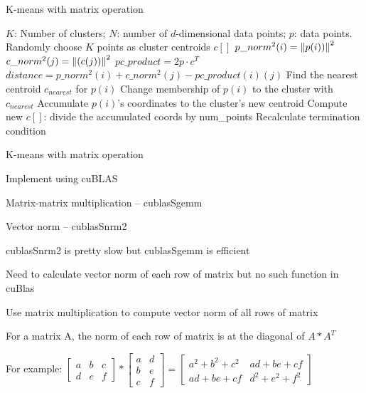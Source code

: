 \documentclass[
nopagebreaks,
style=klope,
fleqn]{powerdot}
\begin{document}
\begin{slide}{K-means with matrix operation}
  \scriptsize
  \begin{algorithmic}[1]
    \INPUT $K$: Number of clusters; $N$: number of $d$-dimensional data points; $p$: data points.
     \label{alg:pm}
    \State Randomly choose $K$ points as cluster centroids $c[]$
    \State $p\_norm^2(i) = \left\lVert p(i))\right\rVert^2$
    \EndFor
    \State $c\_norm^2(j) = \left\lVert(c(j))\right\rVert^2$
    \EndFor
    \State $pc\_product = 2 p \cdot c^T$
    \State $distance = p\_norm^2(i) + c\_norm^2(j) - pc\_product(i)(j)$
    \EndFor
    \State Find the nearest centroid $c_{nearest}$ for $p(i)$
    \State Change membership of $p(i)$ to the cluster with $c_{nearest}$
    \State Accumulate $p(i)$'s coordinates to the cluster's new centroid
    \EndParFor
    \State Compute new $c[]$: divide the accumulated coords by num\_points
    \State Recalculate termination condition
    \EndWhile
    \EndFunction
  \end{algorithmic}
\end{slide}

\begin{slide}{K-means with matrix operation}
  \begin{compactitem}
  \item{Implement using cuBLAS}
  \item{Matrix-matrix multiplication -- cublasSgemm}
  \item{Vector norm -- cublasSnrm2}
  \item{cublasSnrm2 is pretty slow but cublasSgemm is efficient
    \begin{compactitem}
    \item{Need to calculate vector norm of each row of matrix but no such function in cuBlas}
    \end{compactitem}
  }
  \item{Use matrix multiplication to compute vector norm of all rows of matrix
    \begin{compactitem}
    \item{For a matrix A, the norm of each row of matrix is at the diagonal of $A * A^T$}
    \item{For example: 
      $
      \begin{bmatrix}
        a & b & c\\
        d & e & f
      \end{bmatrix}
      *
      \begin{bmatrix}
        a & d \\
        b & e \\
        c & f
      \end{bmatrix}
      =
      \begin{bmatrix}
        a^2+b^2+c^2 & ad + be + cf \\
        ad + be + cf & d^2 + e^2 + f^2
      \end{bmatrix}
      $
    }  
    \end{compactitem}
  } 
  \end{compactitem}
\end{slide}
\end{document}
